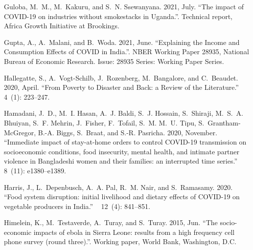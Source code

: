 \documentclass{wber}
\begin{document}
\begin{thebibliography}{}
Guloba, M.~M., M.~Kakuru, and S.~N. Ssewanyana. 2021, July.
\newblock ``The impact of {COVID}-19 on industries without smokestacks in
  {Uganda}.''.
\newblock Technical report, Africa Growth Initiative at Brookings.

Gupta, A., A.~Malani, and B.~Woda. 2021, June.
\newblock ``Explaining the {Income} and {Consumption} {Effects} of {COVID} in
  {India}.''.
\newblock NBER Working Paper 28935, National Bureau of Economic Research.
\newblock Issue: 28935 Series: Working Paper Series.

Hallegatte, S., A.~Vogt-Schilb, J.~Rozenberg, M.~Bangalore, and C.~Beaudet.
  2020, April.
\newblock ``From {Poverty} to {Disaster} and {Back}: a {Review} of the
  {Literature}.''
~{ 4\/}~(1):
  223--247.

Hamadani, J.~D., M.~I. Hasan, A.~J. Baldi, S.~J. Hossain, S.~Shiraji, M.~S.~A.
  Bhuiyan, S.~F. Mehrin, J.~Fisher, F.~Tofail, S.~M. M.~U. Tipu,
  S.~Grantham-McGregor, B.-A. Biggs, S.~Braat, and S.-R. Pasricha. 2020,
  November.
\newblock ``Immediate impact of stay-at-home orders to control {COVID}-19
  transmission on socioeconomic conditions, food insecurity, mental health, and
  intimate partner violence in {Bangladeshi} women and their families: an
  interrupted time series.''
~{ 8\/}~(11): e1380--e1389.

Harris, J., L.~Depenbusch, A.~A. Pal, R.~M. Nair, and S.~Ramasamy. 2020.
\newblock ``Food system disruption: initial livelihood and dietary effects of
  {COVID}-19 on vegetable producers in {India}.''
~{ 12\/}~(4): 841--851.

Himelein, K., M.~Testaverde, A.~Turay, and S.~Turay. 2015, Jun.
\newblock ``The socio-economic impacts of ebola in {Sierra Leone}: results from
  a high frequency cell phone survey (round three).''.
\newblock Working paper, World Bank, Washington, D.C.


\end{thebibliography}
\end{document}
